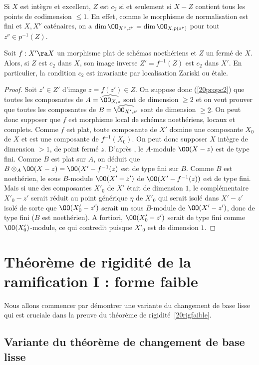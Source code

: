 \documentclass[10pt]{../fichiers-configuration-latex/smfart}
\begin{document}
\begin{remarque}\label{20remc2} Si $X$ est intègre et excellent, $Z$ est $c_2$ si et seulement si
$X-Z$ contient tous les points de codimension $\leq 1$. En effet, comme le morphisme de
normalisation est fini et $X, X^\nu$  caténaires, on a $\dim\OO_{X^\nu,z^\nu}=\dim\OO_{X,p(z^\nu)}$
pour tout $z^\nu\in p^{-1}(Z)$.\end{remarque}

\begin{proposition}\label{20platc2} Soit $f:X'\ra X$ un morphisme plat de schémas noethériens et $Z$
un fermé de $X$. Alors, si $Z$ est $c_2$ dans $X$, son image inverse $Z'=f^{-1}(Z)$ est $c_2$ dans
$X'$. En particulier, la condition $c_2$ est invariante par localisation Zariski ou
étale.\end{proposition}

\begin{proof}Soit $z'\in Z'$ d'image $z=f(z')\in Z$. On suppose donc (\ref{20propc2}) que toutes les
composantes de $A=\widehat{\OO_{X,z}}$ sont de dimension $\geq 2$ et on veut prouver que toutes les
composantes de $B=\widehat{\OO_{X',z'}}$ sont de dimension $\geq 2$. On peut donc supposer que $f$
est morphisme local de schémas noethériens, locaux et complets. Comme $f$ est plat, toute composante
de $X'$  domine une composante $X_0$ de $X$ et est une composante de $f^{-1}(X_0)$. On peut donc
supposer $X$ intègre de dimension $>1$, de point fermé $z$. D'après , le
$A$-module $\OO(X-z)$ est de type fini. Comme $B$ est plat sur $A$, on déduit que
$B\otimes_A\OO(X-z)=\OO(X'-f^{-1}(z)$ est de type fini sur $B$. Comme $B$ est noethérien, le sous
$B$-module $\OO(X'-z')$ de $\OO(X'-f^{-1}(z))$ est de type fini. Mais si une des composantes $X'_0$ de
$X'$ était de dimension $1$, le complémentaire $X'_0-z'$ serait réduit au point générique $\eta$ de
$X'_0$ qui serait isolé dans $X'-z'$ isolé de sorte que $\OO(X'_0-z')$ serait un sous $B$-module de
$\OO(X'-z')$, donc de type fini ($B$ est noethérien). A fortiori, $\OO(X'_0-z')$ serait de type fini
comme $\OO(X'_0)$-module, ce qui contredit  puisque $X'_0$ est de dimension
$1$.\end{proof}

\section{Théorème de rigidité de la ramification I : forme faible } Nous allons commencer par
démontrer une variante du changement de base lisse qui est cruciale dans la preuve du théorème de
rigidité~\ref{20rigfaible}.  \subsection{Variante du théorème de changement de base lisse}
\end{document}
